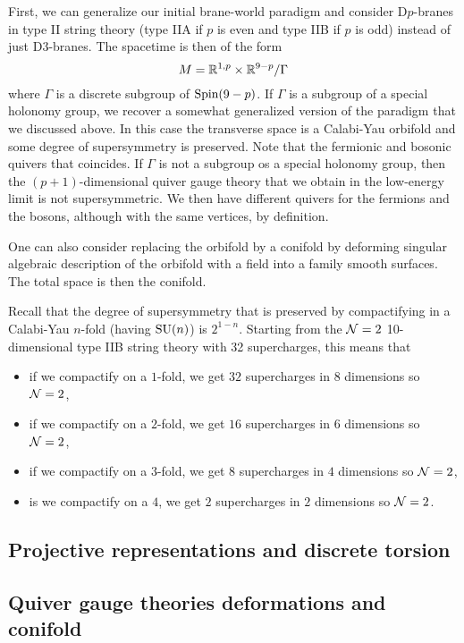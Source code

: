 \documentclass[a4paper,10pt]{article}
\begin{document}
        First, we can generalize our initial brane-world paradigm and consider D$p$-branes in type II string theory (type IIA if $p$ is even and type IIB if $p$ is odd) instead of just D$3$-branes. The spacetime is then of the form
        \begin{equation}
            M = \mathbb{R}^{1,p}\times\mathbb{R}^{9-p}/\Gamma
        \end{equation}
        where $\Gamma$ is a discrete subgroup of $\text{Spin}(9-p)$. If $\Gamma$ is a subgroup of a special holonomy group, we recover a somewhat generalized version of the paradigm that we discussed above. In this case the transverse space is a Calabi-Yau orbifold and some degree of supersymmetry is preserved. Note that the fermionic and bosonic quivers that coincides. If $\Gamma$ is not a subgroup os a special holonomy group, then the $(p+1)$-dimensional quiver gauge theory that we obtain in the low-energy limit is not supersymmetric. We then have different quivers for the fermions and the bosons, although with the same vertices, by definition.

        One can also consider replacing the orbifold by a conifold by deforming singular algebraic description of the orbifold with a field into a family smooth surfaces. The total space is then the conifold.

        Recall that the degree of supersymmetry that is preserved by compactifying in a Calabi-Yau $n$-fold (having $\text{SU}(n)$) is $2^{1-n}$. Starting from the $\mathcal{N}=2$ 10-dimensional type IIB string theory with 32 supercharges, this means that
        \begin{itemize}
            \item if we compactify on a $1$-fold, we get $32$ supercharges in $8$ dimensions so $\mathcal{N}=2$,
            \item if we compactify on a $2$-fold, we get $16$ supercharges in $6$ dimensions so $\mathcal{N}=2$,
            \item if we compactify on a $3$-fold, we get $8$ supercharges in $4$ dimensions so $\mathcal{N}=2$,
            \item is we compactify on a $4$, we get $2$ supercharges in $2$ dimensions so $\mathcal{N}=2$.
        \end{itemize}

    \subsection{Projective representations and discrete torsion}

    \subsection{Quiver gauge theories deformations and conifold}
\end{document}
